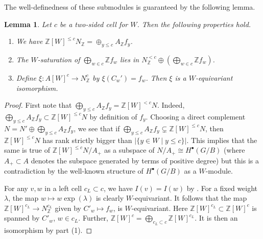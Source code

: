 \documentclass{amsart}
\newtheorem{lemma}[thm]{Lemma}
\theoremstyle{definition}
\newcommand{\BZ}{\mathbb{Z}}
\begin{document}
The well-definedness of these submodules is guaranteed by the following lemma.
\begin{lemma}\label{lem:cellmz}
    Let $c$ be a two-sided cell for $W$. Then the following properties hold.
    \begin{enumerate}
        \item We have $\mathbb{Z}[W]^{\leq c}N_\mathbb{Z} = \oplus_{y\leq c}A_{\mathbb{Z}}f_y$.
        \item The $W$-saturation of $\bigoplus_{w \in c} \mathbb{Z}f_w$ lies in $N^{<c}_\mathbb{Z} \oplus (\bigoplus_{w \in c}\mathbb{Z}f_w)$.
        \item Define $\xi\colon  A[W]^c \to N_{\mathbb{Z}}^c$ by $\xi(C_w') = f_w$. Then $\xi$ is a $W$-equivariant isomorphism.\label{part:cellmz3}
    \end{enumerate}
\end{lemma}
\begin{proof}
    First note that $\bigoplus_{y\leq c}A_\mathbb{Z} f_y=\mathbb{Z}[W]^{<c}N$. Indeed,
  $\bigoplus_{y\leq c}A_\BZ f_y\subset\BZ[W]^{\leq c}N$ by definition of $f_y$.
  Choosing a direct complement $N=N'\oplus\bigoplus_{y\leq c}A_\BZ f_y$,
  we see that if $\bigoplus_{y\leq c}A_\BZ f_y\subsetneq\BZ[W]^{\leq c}N$, then
  $\BZ[W]^{\leq c}N$ has rank strictly bigger than $|\{y\in W\mid y\leq c\}|$. This implies that the same is true of $\BZ[W]^{\leq c}N/A_+$ as a subspace of $N/A_+ \cong H^\bullet(G/B)$ (where $A_+\subset A$ denotes the subspace generated by terms of positive degree) but this is a contradiction by the well-known structure of $H^\bullet(G/B)$ as a $W$-module.

  For any $v,w$ in a left cell $c_L\subset c$, we have $I(v)=I(w)$ by \cite[Section 8.6]{LUnequal}.
  For a fixed weight $\lambda$, the map $w\mapsto w\exp(\lambda)$ is
  clearly $W$-equivariant. It follows that the map $\BZ[W]^{c_L}\to N^{c_L}_{\mathbb{Z}}$ given by 
  $C'_w\mapsto f_w$, is $W$-equivariant. Here $\BZ[W]^{c_L}\subset\BZ[W]^c$
  is spanned by $C'_w$, $w\in c_L$. Further,
  $\BZ[W]^c=\bigoplus_{c_L\subset c}\BZ[W]^{c_L}$. It is then an isomorphism by part (1).
\end{proof}
\end{document}
